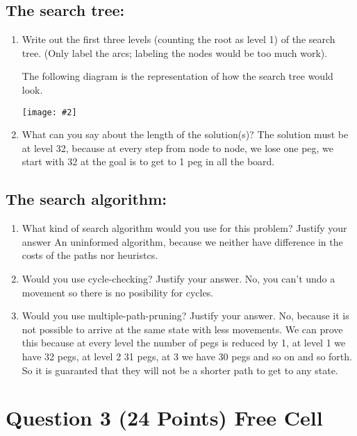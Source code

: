 \documentclass{article}
\def\ans#1{{\color{ans}#1}}
\newcommand{\centerfig}[2]{\begin{center}\texttt{[image: \#2]}\end{center}}
\begin{document}
\subsection{The search tree:}
\begin{enumerate}[label=(\alph*)]
    \item Write out the first three levels (counting the root as level 1) of the search tree. (Only label the arcs; labeling the nodes would be too much work).
    \ans{
        The following diagram is the representation of how the search tree would look.
        \centerfig{0.8}{../figs/q2_2_a}
    }
    \item What can you say about the length of the solution(s)?
    \ans{
        The solution must be at level 32, because at every step from node to node, we 
        lose one peg, we start with 32 at the goal is to get to 1 peg in all the board.
    }

\end{enumerate}

\subsection{The search algorithm:}
\begin{enumerate}[label=(\alph*)]
    \item What kind of search algorithm would you use for this problem? Justify your answer
    \ans{
        An uninformed algorithm, because we neither have difference in the costs of the paths
        nor heuristcs.
    }
    \item Would you use cycle-checking? Justify your answer.
    \ans{
        No, you can't undo a movement so there is no posibility for cycles.
    }
    \item Would you use multiple-path-pruning? Justify your answer.
    \ans{
        No, because it is not possible to arrive at the same state with less movements. 
        We can prove this because at every level the number of pegs is reduced by 1, at 
        level 1 we have 32 pegs, at level 2 31 pegs, at 3 we have 30 pegs and so on and 
        so forth. So it is guaranted that they will not be a shorter path to get to any 
        state.
    }
\end{enumerate}


\clearpage
\section{Question 3 (24 Points) Free Cell }
\end{document}
